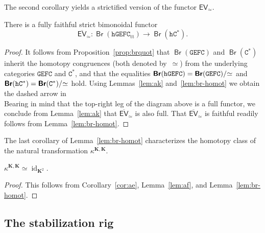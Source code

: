 \documentclass[10pt]{simplearticle}
\newcommand{\tikzinput}[1]{}
\newcommand{\id}{\operatorname{id}}
\newcommand{\GEFC}{\mathbb{\mathtt{GEFC}}}
\newcommand{\hGEFC}{\mathtt{hGEFC}}
\newcommand{\Cstar}{\mathtt{C^{*}}}
\newcommand{\hCstar}{\mathtt{hC^{*}}}
\newcommand{\mathsb}[1]{\boldsymbol{\mathsf{#1}}}
\newcommand{\Br}{\operatorname{\mathsb{Br}}}
\newcommand{\EV}{\mathsb{EV}}
\newcommand{\fK}{\mathbf{K}}
\newcommand{\ttt}{\operatorname{tt}}
\newcommand{\modrel}[1]{/\hspace{-0.6ex}#1\hspace{0.1ex}}
\begin{document}
The second corollary yields a strictified version of the functor $\EV_{\simeq}$.
\begin{lem}\label{lem:EV-hGEFC}
There
is a fully faithful strict
bimonoidal functor
\[
\overline{\EV}_{\simeq}\colon\Br(\hGEFC_{\ttt})\to\Br(\hCstar).
\]
\end{lem}

\begin{proof}
It follows from Proposition~\ref{prop:brquot} that $\Br(\GEFC)$
and $\Br(\Cstar)$ inherit
the homotopy congruences
(both denoted by~$\simeq$) from the underlying categories $\GEFC$
and $\Cstar$, and that the equalities $\Br(\hGEFC)=\Br(\GEFC)\modrel{\simeq}$
and $\Br(\hCstar)=\Br(\Cstar)\modrel{\simeq}$ hold. Using Lemmas~\ref{lem:ak}
and~\ref{lem:br-homot} we obtain the dashed arrow in
\[
\tikzinput{d436}
\]
Bearing in mind that the top-right leg of the diagram above is a full
functor, we conclude from Lemma~\ref{lem:ak} that $\overline{\EV}_{\simeq}$
is also full. That $\overline{\EV}_{\simeq}$ is faithful readily
follows from Lemma~\ref{lem:br-homot}.
\end{proof}

The last corollary of Lemma~\ref{lem:br-homot} characterizes the
homotopy class of the natural transformation $\kappa^{\fK,\fK}$.

\begin{cor}\label{cor:ai}
$\kappa^{\fK,\fK}\simeq\id_{\fK^{2}}$.
\end{cor}

\begin{proof}
This follows from Corollary~\ref{cor:ae}, Lemma~\ref{lem:af},
and Lemma~\ref{lem:br-homot}.
\end{proof}

\subsection{\label{subsec:starig}The stabilization rig}
\end{document}
